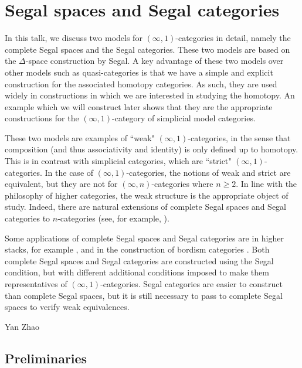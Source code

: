 \chapter{Segal spaces and Segal categories}


\begin{refsection}


In this talk, we discuss two models for $(\infty,1)$-categories in detail, namely the complete Segal spaces and the Segal categories. These two models are based on the $\Delta$-space construction by Segal. A key advantage of these two models over other models such as quasi-categories is that we have a simple and explicit construction for the associated homotopy categories. As such, they are used widely in constructions in which we are interested in studying the homotopy. An example which we will construct later shows that they are the appropriate constructions for the $(\infty,1)$-category of simplicial model categories.

These two models are examples of ``weak" $(\infty,1)$-categories, in the sense that composition (and thus associativity and identity) is only defined up to homotopy. This is in contrast with simplicial categories, which are ``strict" $(\infty,1)$-categories. In the case of $(\infty,1)$-categories, the notions of weak and strict are equivalent, but they are not for $(\infty,n)$-categories where $n\ge2$. In line with the philosophy of higher categories, the weak structure is the appropriate object of study. Indeed, there are natural extensions of complete Segal spaces and Segal categories to $n$-categories (see, for example, \cite{brinftyn,hs,lurietft}).

Some applications of complete Segal spaces and Segal categories are in higher stacks, for example \cite{hs}, and in the construction of bordism categories \cite{lurietft}. Both complete Segal spaces and Segal categories are constructed using the Segal condition, but with different additional conditions imposed to make them representatives of $(\infty,1)$-categories. Segal categories are easier to construct than complete Segal spaces, but it is still necessary to pass to complete Segal spaces to verify weak equivalences.

\begin{flushright}
Yan Zhao
\end{flushright}

\section{Preliminaries}

\end{refsection}
